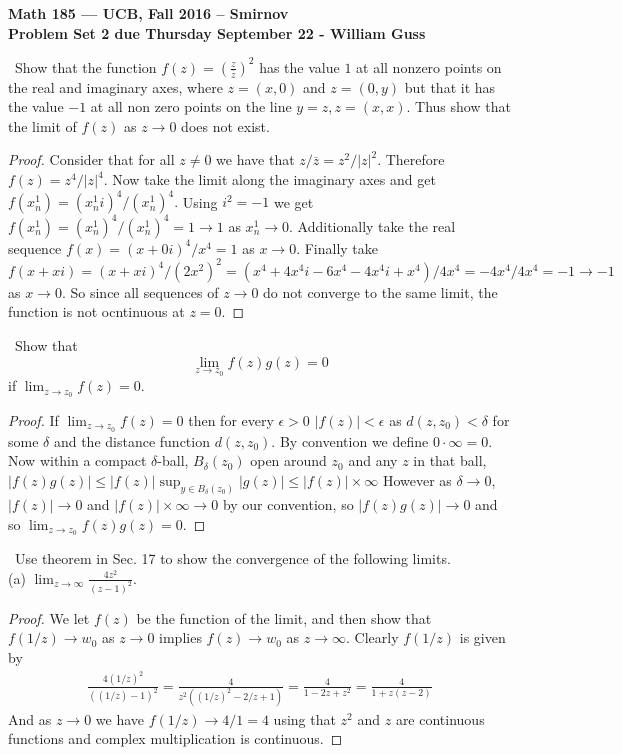 \documentclass[11pt]{amsart}
\theoremstyle{definition}
\numberwithin{theorem}{section}
\numberwithin{definition}{section}
\numberwithin{equation}{section}
\begin{document}
\begin{center}{\bf Math 185 --- UCB, Fall 2016 -- Smirnov}
\\
{\bf Problem Set 2 due Thursday September 22 - William Guss}
\end{center}
\medskip {}\ Show that the function $f(z) = \left(\frac{z}{\overline{z}}\right)^2$
has the value $1$ at all nonzero points on the real and imaginary axes, where $z = (x,0)$ and $z = (0,y)$ but that it has the value $-1$ at all non zero points on the line $y=z, z= (x,x)$. Thus show that the limit of $f(z)$ as $z \to 0$ does not exist.
\begin{proof}
  Consider that for all $z \neq 0$ we have that $z/\overline{z} = z^2/|z|^2.$ Therefore $f(z) = z^4/|z|^4$. Now take
  the limit along the imaginary axes and get $f(x^1_n) = (x^1_ni)^4/(x^1_n)^4.$ Using $i^2 = -1$ we get $f(x^1_n) = (x^1_n)^4/(x^1_n)^4 = 1 \to 1$ as $x^1_n \to 0$. Additionally take the real sequence $f(x) = (x + 0i)^4/x^4 = 1$ as $x\to 0$. Finally take $f(x + xi) = (x +xi)^4/(2x^2)^2 = (x^4 + 4x^4i -6x^4 -4x^4i +x^4)/4x^4 = -4x^4/4x^4 = -1 \to -1$ as $x \to 0$. So since all sequences of $z \to 0$ do not converge to the same limit, the function is not ocntinuous at $z = 0.$  
\end{proof}

\medskip {}\ Show that 
\begin{equation*}
  \lim_{z \to z_0} f(z) g(z) = 0
\end{equation*}
if $\lim_{z \to z_0} f(z) = 0$.
\begin{proof}
  If $\lim_{z \to z_0} f(z) = 0$ then for every $\epsilon > 0$ $|f(z)| < \epsilon$ as $d(z, z_0) < \delta$ for some $\delta$ and the distance function $d(z, z_0).$ By convention we define $0 \cdot \infty = 0$. Now within a compact $\delta$-ball, $B_\delta(z_0)$ open around $z_0$ and any $z$ in that ball, $|f(z)g(z)| \leq |f(z)|\sup_{y \in B_{\delta}(z_0)} |g(z)| \leq |f(z)|\times\infty$ However as $\delta \to 0$, $|f(z)| \to 0$ and $|f(z)|\times \infty \to 0$ by our convention, so $|f(z)g(z)| \to 0$ and so $\lim_{z \to z_0} f(z)g(z) = 0$.
\end{proof}

\medskip {}\ Use theorem in Sec. 17 to show the convergence of the following limits.\\

\noindent (a) $\lim_{z \to \infty} \frac{4z^2}{(z-1)^2}.$
\begin{proof}
  We let $f(z)$ be the function of the limit, and then show that $f(1/z) \to w_0$ as $z \to 0$ implies $f(z) \to w_0$ as $z \to \infty.$ Clearly $f(1/z)$ is given by
  \begin{equation*}
    \begin{aligned}
      \frac{4(1/z)^2}{((1/z)-1)^2} = \frac{4}{z^2((1/z)^2 -2/z +1)} = \frac{4}{1 -2z +z^2} = \frac{4}{1+z(z-2)}
    \end{aligned}
  \end{equation*}
  And as $z \to 0$ we have $f(1/z) \to 4/1 = 4$ using that $z^2$ and $z$ are continuous functions and complex multiplication is continuous. 
\end{proof}
\end{document}
